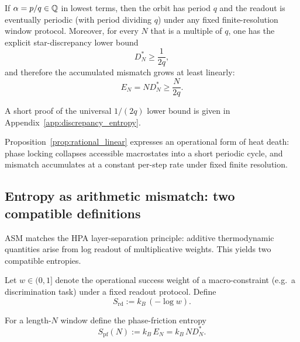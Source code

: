 \begin{proposition}
\label{prop:rational_linear}
If $\alpha=p/q\in\mathbb{Q}$ in lowest terms, then the orbit has period $q$ and the readout is eventually periodic (with period dividing $q$) under any fixed finite-resolution window protocol. Moreover, for every $N$ that is a multiple of $q$, one has the explicit star-discrepancy lower bound
\begin{equation}
  D_N^\ast \ge \frac{1}{2q},
\end{equation}
and therefore the accumulated mismatch grows at least linearly:
\begin{equation}
  E_N = N D_N^\ast \ge \frac{N}{2q}.
\end{equation}
\end{proposition}
\noindent A short proof of the universal $1/(2q)$ lower bound is given in Appendix~\ref{app:discrepancy_entropy}.

\noindent Proposition~\ref{prop:rational_linear} expresses an operational form of heat death: phase locking collapses accessible macrostates into a short periodic cycle, and mismatch accumulates at a constant per-step rate under fixed finite resolution.

\subsection{Entropy as arithmetic mismatch: two compatible definitions}

ASM matches the HPA layer-separation principle: additive thermodynamic quantities arise from log readout of multiplicative weights. This yields two compatible entropies.

\begin{definition}
Let $w\in(0,1]$ denote the operational success weight of a macro-constraint (e.g.\ a discrimination task) under a fixed readout protocol. Define
\begin{equation}
S_{\mathrm{rd}} := k_B\,(-\log w).
\end{equation}
\end{definition}

\begin{definition}
For a length-$N$ window define the phase-friction entropy
\begin{equation}
S_{\mathrm{pf}}(N) := k_B\,E_N = k_B\,N D_N^\ast.
\end{equation}
\end{definition}

